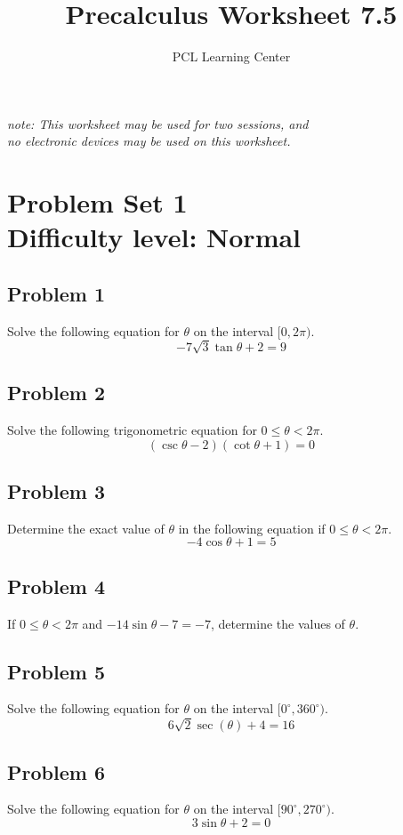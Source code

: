 \documentclass[12pt]{article}
\title{Precalculus Worksheet 7.5}
\author{PCL Learning Center}
\date{}
\begin{document}
\maketitle

\begin{center}
    \textit{note: This worksheet may be used for two sessions, and\\no electronic devices may be used on this worksheet.}
\end{center}

\section*{Problem Set 1\\Difficulty level: Normal}

\subsection*{Problem 1}
Solve the following equation for \(\theta\) on the interval \([0,2\pi).\)
\[-7\sqrt{3}\tan \theta + 2 = 9\]

\subsection*{Problem 2}
Solve the following trigonometric equation for \(0 \leq \theta < 2\pi\).
\[(\csc \theta - 2)(\cot \theta + 1) = 0\]

\subsection*{Problem 3}
Determine the exact value of \(\theta\) in the following equation if \(0 \leq \theta < 2\pi\).
\[-4\cos \theta + 1 = 5\]

\subsection*{Problem 4}
If \(0 \leq \theta < 2\pi\) and \(-14\sin \theta - 7 = -7\), determine the values of \(\theta\).

\subsection*{Problem 5}
Solve the following equation for \(\theta\) on the interval \([0^\circ, 360^\circ)\).
\[6\sqrt{2} \sec(\theta) + 4 = 16\]

\subsection*{Problem 6}
Solve the following equation for \(\theta\) on the interval \([90^\circ, 270^\circ)\).
\[3\sin \theta + 2 = 0\]
\end{document}
